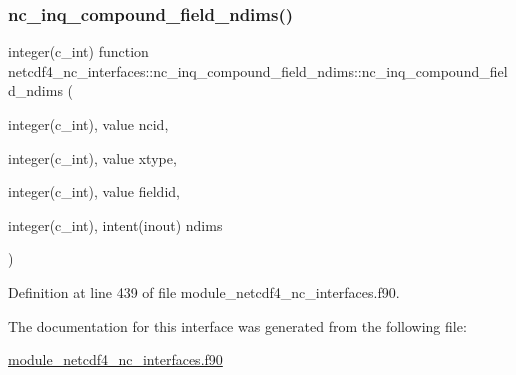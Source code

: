 \subsubsection{\texorpdfstring{nc\+\_\+inq\+\_\+compound\+\_\+field\+\_\+ndims()}{nc\_inq\_compound\_field\_ndims()}}
{\footnotesize\ttfamily integer(c\+\_\+int) function netcdf4\+\_\+nc\+\_\+interfaces\+::nc\+\_\+inq\+\_\+compound\+\_\+field\+\_\+ndims\+::nc\+\_\+inq\+\_\+compound\+\_\+field\+\_\+ndims (\begin{DoxyParamCaption}\item[{integer(c\+\_\+int), value}]{ncid,  }\item[{integer(c\+\_\+int), value}]{xtype,  }\item[{integer(c\+\_\+int), value}]{fieldid,  }\item[{integer(c\+\_\+int), intent(inout)}]{ndims }\end{DoxyParamCaption})}



Definition at line 439 of file module\+\_\+netcdf4\+\_\+nc\+\_\+interfaces.\+f90.



The documentation for this interface was generated from the following file\+:\begin{DoxyCompactItemize}
\item 
\hyperlink{module__netcdf4__nc__interfaces_8f90}{module\+\_\+netcdf4\+\_\+nc\+\_\+interfaces.\+f90}\end{DoxyCompactItemize}

